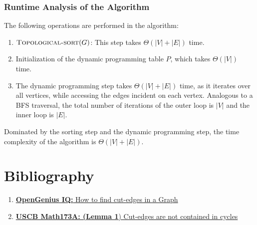 \documentclass[12pt]{report}
\begin{document}
    \subsubsection*{Runtime Analysis of the Algorithm}
    The following operations are performed in the algorithm:
    \begin{enumerate}
        \item $\Call{Topological-sort}{G}$: This step takes $\Theta(|V|+|E|)$ time.
        \item Initialization of the dynamic programming table $P$, which takes $\Theta(|V|)$ time.
        \item The dynamic programming step takes $\Theta(|V|+|E|)$ time, as it iterates over all vertices,
        while accessing the edges incident on each vertex.
        Analogous to a BFS traversal, the total number of iterations of the outer loop is $|V|$ and the inner loop is $|E|$.
    \end{enumerate}
    Dominated by the sorting step and the dynamic programming step, the time complexity of the algorithm is $\Theta(|V|+|E|)$.
    \vfill
    \pagebreak

    \section*{Bibliography}
    \begin{enumerate}
        \item
        \href{
            https://iq.opengenus.org/find-cut-edges-in-a-graph/#:~:text=A%
            }{\textbf{OpenGenius IQ:} How to find cut-edges in a Graph}
        \item
        \href{
            https://math.stackexchange.com/questions/1729779/prove-that-an-edge-e-is-contained-in-a-cycle-iff-e-is-not-a-cut-edge-in-a-si
        }{\textbf{USCB Math173A: (Lemma  1}) Cut-edges are not contained in cycles}
    \end{enumerate}
\end{document}
